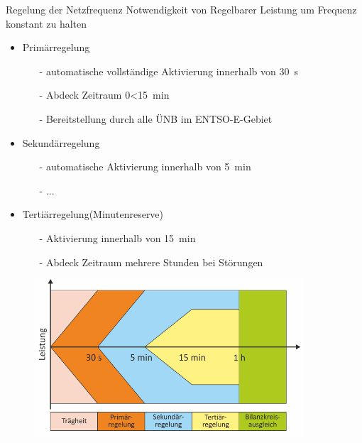 \documentclass[aspectratio=1610, professionalfonts, 9pt]{beamer}
\begin{document}
\begin{frame}{Regelung der Netzfrequenz}
Notwendigkeit von Regelbarer Leistung um Frequenz konstant zu halten
\begin{itemize}
\item Primärregelung
  \begin{itemize}
    \item[-] automatische vollständige Aktivierung innerhalb von \SI{30}{\second}
    \item[-] Abdeck Zeitraum \num{0}<\SI{15}{\minute}
    \item[-] Bereitstellung durch alle ÜNB im ENTSO-E-Gebiet
  \end{itemize}
\item Sekundärregelung
\begin{itemize}
\item[-] automatische Aktivierung innerhalb von \SI{5}{\minute}
\item[-] ...
\end{itemize}
\item Tertiärregelung(Minutenreserve)
\begin{itemize}
  \item[-] Aktivierung innerhalb von \SI{15}{\minute}
  \item[-] Abdeck Zeitraum mehrere Stunden bei Störungen
\end{itemize}
\end{itemize}
\end{frame}

{
\begin{frame}
  \begin{figure}
  \includegraphics[width=0.9\textwidth]{images/Regelleistung.png}
\end{figure}
\end{frame}
}
\end{document}
